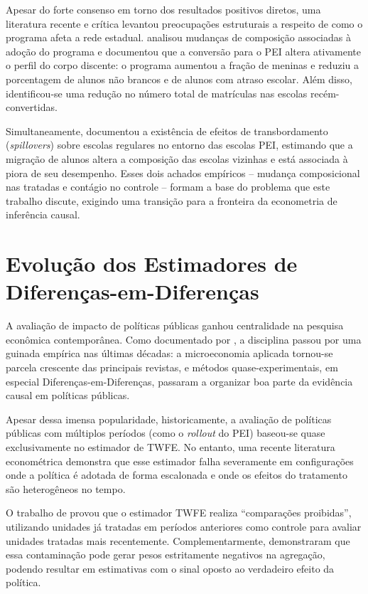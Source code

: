 Apesar do forte consenso em torno dos resultados positivos diretos, uma literatura recente e crítica levantou preocupações estruturais a respeito de como o programa afeta a rede estadual. \textcite{favaro_composicao_pei} analisou mudanças de composição associadas à adoção do programa e documentou que a conversão para o PEI altera ativamente o perfil do corpo discente: o programa aumentou a fração de meninas e reduziu a porcentagem de alunos não brancos e de alunos com atraso escolar. Além disso, identificou-se uma redução no número total de matrículas nas escolas recém-convertidas. 

Simultaneamente, \textcite{santos2022_spillover_pei_escolas_regulares} documentou a existência de efeitos de transbordamento (\textit{spillovers}) sobre escolas regulares no entorno das escolas PEI, estimando que a migração de alunos altera a composição das escolas vizinhas e está associada à piora de seu desempenho. Esses dois achados empíricos -- mudança composicional nas tratadas e contágio no controle -- formam a base do problema que este trabalho discute, exigindo uma transição para a fronteira da econometria de inferência causal.

\section{Evolução dos Estimadores de Diferenças-em-Diferenças} \label{sec:diffindiff}

A avaliação de impacto de políticas públicas ganhou centralidade na pesquisa econômica contemporânea. Como documentado por \textcite{currie2020}, a disciplina passou por uma guinada empírica nas últimas décadas: a microeconomia aplicada tornou-se parcela crescente das principais revistas, e métodos quase-experimentais, em especial Diferenças-em-Diferenças, passaram a organizar boa parte da evidência causal em políticas públicas.

Apesar dessa imensa popularidade, historicamente, a avaliação de políticas públicas com múltiplos períodos (como o \textit{rollout} do PEI) baseou-se quase exclusivamente no estimador de TWFE. No entanto, uma recente literatura econométrica demonstra que esse estimador falha severamente em configurações onde a política é adotada de forma escalonada e onde os efeitos do tratamento são heterogêneos no tempo. 

O trabalho de \textcite{goodmanbacon} provou que o estimador TWFE realiza ``comparações proibidas'', utilizando unidades já tratadas em períodos anteriores como controle para avaliar unidades tratadas mais recentemente. Complementarmente, \textcite{chaisemartin2020} demonstraram que essa contaminação pode gerar pesos estritamente negativos na agregação, podendo resultar em estimativas com o sinal oposto ao verdadeiro efeito da política.

